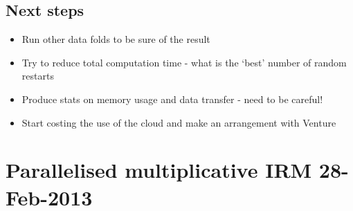 \documentclass[twoside,11pt]{article}
\begin{document}
\subsection{Next steps}

\begin{itemize}
\item Run other data folds to be sure of the result
\item Try to reduce total computation time - what is the `best' number of random restarts
\item Produce stats on memory usage and data transfer - need to be careful! 
\item Start costing the use of the cloud and make an arrangement with Venture
\end{itemize}

\section{Parallelised multiplicative IRM 28-Feb-2013}
\end{document}
